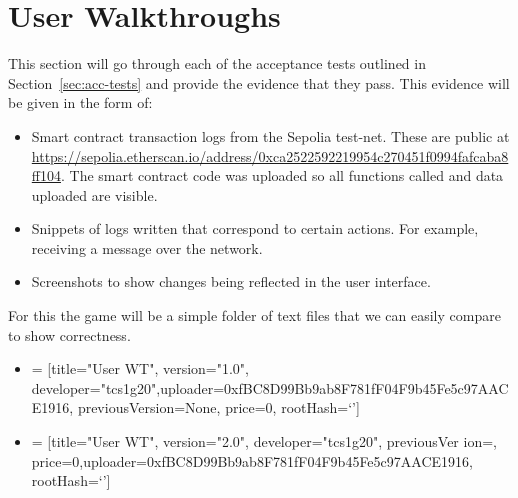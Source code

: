 
\chapter{User Walkthroughs}\label{app:user-walkthrough}

This section will go through each of the acceptance tests outlined in Section~\ref{sec:acc-tests} and provide the evidence that they pass. This evidence will be given in the form of:

\begin{itemize}
  \item Smart contract transaction logs from the Sepolia test-net. These are public at \small\url{https://sepolia.etherscan.io/address/0xca2522592219954c270451f0994fafcaba8ff104}\normalsize. The smart contract code was uploaded so all functions called and data uploaded are visible.
  \item Snippets of logs written that correspond to certain actions. For example, receiving a message over the network.
  \item Screenshots to show changes being reflected in the user interface.
\end{itemize}

\newparagraph
For this the game will be a simple folder of text files that we can easily compare to show correctness.

\small
\begin{itemize}
  \item {} = [title="User WT", version="1.0", developer="tcs1g20",\newline uploader=0xfBC8D99Bb9ab8F781fF04F9b45Fe5c97AACE1916, previousVersion=None, price=0, rootHash=`']
  \item {} = [title="User WT", version="2.0", developer="tcs1g20", previousVer ion=, price=0,\newline uploader=0xfBC8D99Bb9ab8F781fF04F9b45Fe5c97AACE1916, rootHash=`']
\end{itemize}
\normalsize





